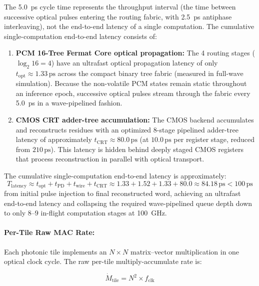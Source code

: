 \documentclass[journal]{IEEEtran}
\begin{document}
The 5.0~ps cycle time represents the throughput interval (the time between successive optical pulses entering the routing fabric, with 2.5~ps antiphase interleaving), not the end-to-end latency of a single computation. The cumulative single-computation end-to-end latency consists of:

\begin{enumerate}
\item \textbf{PCM 16-Tree Fermat Core optical propagation:} The 4 routing stages ($\log_2 16 = 4$) have an ultrafast optical propagation latency of only $t_{\text{opt}} \approx 1.33\,\text{ps}$ across the compact binary tree fabric (measured in full-wave simulation). Because the non-volatile PCM states remain static throughout an inference epoch, successive optical pulses stream through the fabric every 5.0~ps in a wave-pipelined fashion.

\item \textbf{CMOS CRT adder-tree accumulation:} The CMOS backend accumulates and reconstructs residues with an optimized 8-stage pipelined adder-tree latency of approximately $t_{\text{CRT}} \approx 80.0\,\text{ps}$ (at $10.0\,\text{ps}$ per register stage, reduced from $210\,\text{ps}$). This latency is hidden behind deeply staged CMOS registers that process reconstruction in parallel with optical transport.
\end{enumerate}

The cumulative single-computation end-to-end latency is approximately:
\begin{equation}
T_{\text{latency}} \approx t_{\text{opt}} + t_{\text{PD}} + t_{\text{wire}} + t_{\text{CRT}} \approx 1.33 + 1.52 + 1.33 + 80.0 \approx 84.18\,\text{ps} < 100\,\text{ps}
\end{equation}
from initial pulse injection to final reconstructed word, achieving an ultrafast end-to-end latency and collapsing the required wave-pipelined queue depth down to only $8\text{--}9$ in-flight computation stages at 100~GHz.

\paragraph{\textbf{Per-Tile Raw MAC Rate:}}
Each photonic tile implements an $N \times N$ matrix--vector multiplication in one optical clock cycle. The raw per-tile multiply-accumulate rate is:

\begin{equation}
\dot{M}_{\text{tile}} = N^2 \times f_{\text{clk}}
\end{equation}
\end{document}
